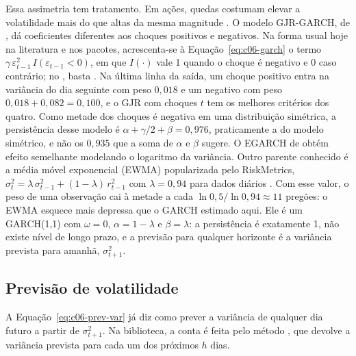 Essa assimetria tem tratamento. Em ações, quedas costumam elevar a volatilidade mais do que altas da mesma magnitude \citep{cont2001}. O modelo GJR-GARCH, de \citet{glosten1993}, dá coeficientes diferentes aos choques positivos e negativos. Na forma usual hoje na literatura e nos pacotes, acrescenta-se à Equação~\eqref{eq:c06-garch} o termo $\gamma\,\varepsilon_{t-1}^2\,I(\varepsilon_{t-1} < 0)$, em que $I(\cdot)$ vale 1 quando o choque é negativo e 0 caso contrário; no , basta . Na última linha da saída, um choque positivo entra na variância do dia seguinte com peso $0,018$ e um negativo com peso $0,018 + 0,082 = 0,100$, e o GJR com choques $t$ tem os melhores critérios dos quatro. Como metade dos choques é negativa em uma distribuição simétrica, a persistência desse modelo é $\alpha + \gamma/2 + \beta = 0,976$, praticamente a do modelo simétrico, e não os $0,935$ que a soma de $\alpha$ e $\beta$ sugere. O EGARCH de \citet{nelson1991} obtém efeito semelhante modelando o logaritmo da variância. Outro parente conhecido é a média móvel exponencial (EWMA) popularizada pelo RiskMetrics, $\sigma_t^2 = \lambda\,\sigma_{t-1}^2 + (1-\lambda)\,r_{t-1}^2$ com $\lambda = 0,94$ para dados diários \citep{hull2018}. Com esse valor, o peso de uma observação cai à metade a cada $\ln 0,5/\ln 0,94 \approx 11$ pregões: o EWMA esquece mais depressa que o GARCH estimado aqui. Ele é um GARCH(1,1) com $\omega = 0$, $\alpha = 1-\lambda$ e $\beta = \lambda$: a persistência é exatamente 1, não existe nível de longo prazo, e a previsão para qualquer horizonte é a variância prevista para amanhã, $\sigma_{t+1}^2$.


\subsection{Previsão de volatilidade}

A Equação~\eqref{eq:c06-prev-var} já diz como prever a variância de qualquer dia futuro a partir de $\sigma_{t+1}^2$. Na biblioteca, a conta é feita pelo método , que devolve a variância prevista para cada um dos próximos $h$ dias.

